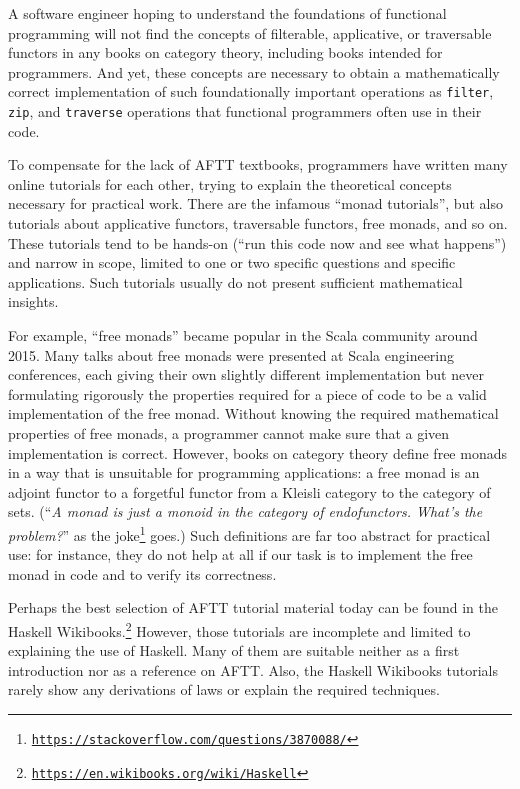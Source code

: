 A software engineer hoping to understand the foundations of functional
programming will not find the concepts of filterable, applicative,
or traversable functors in any books on category theory, including
books intended for programmers. And yet, these concepts are necessary
to obtain a mathematically correct implementation of such foundationally
important operations as \lstinline!filter!, \lstinline!zip!, and
\lstinline!traverse! \textendash{} operations that functional programmers
often use in their code.

To compensate for the lack of AFTT textbooks, programmers have written
many online tutorials for each other, trying to explain the theoretical
concepts necessary for practical work. There are the infamous ``monad
tutorials'', but also tutorials about applicative functors, traversable
functors, free monads, and so on. These tutorials tend to be hands-on
(``run this code now and see what happens'') and narrow in scope,
limited to one or two specific questions and specific applications.
Such tutorials usually do not present sufficient mathematical insights.

For example, ``free monads'' became popular in the Scala community
around 2015. Many talks about free monads were presented at Scala
engineering conferences, each giving their own slightly different
implementation but never formulating rigorously the properties required
for a piece of code to be a valid implementation of the free monad.
Without knowing the required mathematical properties of free monads,
a programmer cannot make sure that a given implementation is correct.
However, books on category theory define free monads in a way that
is unsuitable for programming applications: a free monad is an adjoint
functor to a forgetful functor from a Kleisli category to the category
of sets. (``\emph{A monad is just a monoid in the category of endofunctors.
What's the problem?}'' as the joke\footnote{\texttt{\href{https://stackoverflow.com/questions/3870088/}{https://stackoverflow.com/questions/3870088/}}}
goes.) Such definitions are far too abstract for practical use: for
instance, they do not help at all if our task is to implement the
free monad in code and to verify its correctness.

Perhaps the best selection of AFTT tutorial material today can be
found in the Haskell Wikibooks.\footnote{\texttt{\href{https://en.wikibooks.org/wiki/Haskell}{https://en.wikibooks.org/wiki/Haskell}}}
However, those tutorials are incomplete and limited to explaining
the use of Haskell. Many of them are suitable neither as a first introduction
nor as a reference on AFTT. Also, the Haskell Wikibooks tutorials
rarely show any derivations of laws or explain the required techniques.

